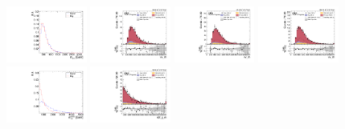 \begin{figure}[!ht]
  \centering
  \includegraphics[width=0.235\textwidth]{analysis_plots/tmva_plots/zv_BDTG14_dibos_m.pdf} \hspace{-12pt}
  \includegraphics[width=0.235\textwidth]{analysis_plots/2016_zv/cr_vjets_l/vv_m.pdf} \hspace{-12pt}
  \includegraphics[width=0.235\textwidth]{analysis_plots/2017_zv/cr_vjets_l/vv_m.pdf} \hspace{-12pt}
  \includegraphics[width=0.235\textwidth]{analysis_plots/2018_zv/cr_vjets_l/vv_m.pdf} \hspace{-12pt} \\ \vspace{-1pt}
  \includegraphics[width=0.235\textwidth]{analysis_plots/tmva_plots/zv_BDTG14_vbf_m.pdf} \hspace{-12pt}
  \includegraphics[width=0.235\textwidth]{analysis_plots/2016_zv/cr_vjets_l/vbf_jj_m.pdf} \hspace{-12pt}

\end{figure}
